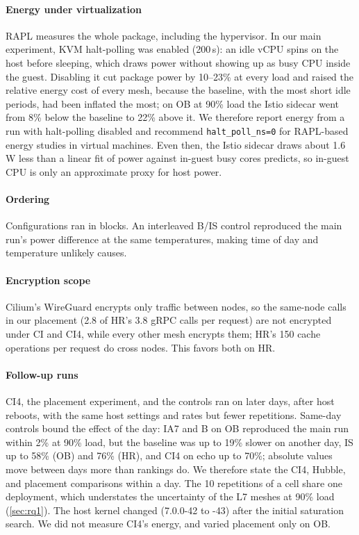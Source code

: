 \paragraph{Energy under virtualization}
RAPL measures the whole package, including the hypervisor. In our main
experiment, KVM halt-polling was enabled (200\,\textmu s): an idle vCPU spins
on the host before sleeping, which draws power without showing up as busy CPU
inside the guest. Disabling it cut package power by 10--23\% at every load and
raised the relative energy cost of every mesh, because the baseline, with the
most short idle periods, had been inflated the most; on OB at 90\% load the
Istio sidecar went from 8\% below the baseline to 22\% above it. We therefore
report energy from a run with halt-polling disabled and recommend
\texttt{halt\_poll\_ns=0} for RAPL-based energy studies in virtual machines.
Even then, the Istio sidecar draws about 1.6\,W less than a linear fit of power
against in-guest busy cores predicts, so in-guest CPU is only an approximate
proxy for host power.

\paragraph{Ordering}
Configurations ran in blocks. An interleaved B/IS control reproduced the
main run's power difference at the same temperatures, making time of day and
temperature unlikely causes.

\paragraph{Encryption scope}
Cilium's WireGuard encrypts only traffic between nodes, so the same-node calls
in our placement (2.8 of HR's 3.8 gRPC calls per request) are not encrypted under
CI and CI4, while every other mesh encrypts them; HR's 150 cache operations per
request do cross nodes. This favors both on HR.

\paragraph{Follow-up runs}
CI4, the placement experiment, and the controls ran on later days, after host
reboots, with the same host settings and rates but fewer repetitions. Same-day
controls bound the effect of the day: IA7 and B on OB reproduced the main run
within 2\% at 90\% load, but the baseline was up to 19\% slower on another
day, IS up to 58\% (OB) and 76\% (HR), and CI4 on echo up to 70\%; absolute
values move between days more than rankings do. We therefore state the CI4,
Hubble, and placement comparisons within a day. The 10 repetitions of a cell
share one deployment, which understates the uncertainty of the L7 meshes at
90\% load (\cref{sec:rq1}). The host kernel changed (7.0.0-42 to -43) after
the initial saturation search. We did not measure CI4's energy, and varied
placement only on OB.

